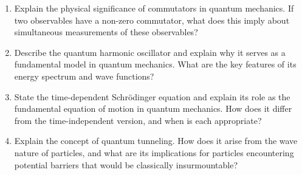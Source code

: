 \documentclass[11pt]{article}
\begin{document}
\begin{enumerate}[label=\textbf{\arabic*.}]
  \item Explain the physical significance of commutators in quantum mechanics. If two observables 
  have a non-zero commutator, what does this imply about simultaneous measurements of these observables?

  \item Describe the quantum harmonic oscillator and explain why it serves as a fundamental model 
  in quantum mechanics. What are the key features of its energy spectrum and wave functions?

  \item State the time-dependent Schr\"odinger equation and explain its role as the fundamental 
  equation of motion in quantum mechanics. How does it differ from the time-independent version, 
  and when is each appropriate?

  \item Explain the concept of quantum tunneling. How does it arise from the wave nature of particles, 
  and what are its implications for particles encountering potential barriers that would be classically 
  insurmountable?

\end{enumerate}
\end{document}
